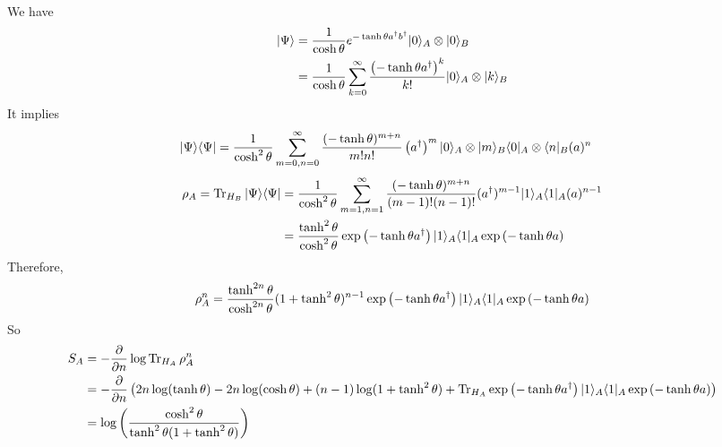 We have 
\begin{equation}
	\begin{split}
	| \Psi \rangle & = \frac{1}{\cosh \theta} e^{-\tanh \theta a^{\dagger} b^{\dagger}} | 0 \rangle_A \otimes | 0 \rangle_B\\
	& = \frac{1}{\cosh \theta} \sum_{k=0}^{\infty} \frac{\left( - \tanh \theta a^{\dagger} \right)^k}{k!} | 0 \rangle_A \otimes | k \rangle_B\\
	\end{split}
\end{equation}
It implies
\begin{equation}
	\begin{split}
	| \Psi \rangle \langle \Psi | & = \frac{1}{\cosh^2 \theta} \sum_{m=0,n=0}^{\infty}\frac{(-\tanh \theta)^{m+n}}{m!n!} \left(a^{\dagger} \right)^m | 0 \rangle_A \otimes | m \rangle_B \langle 0 |_A \otimes \langle n |_B (a)^n
	\end{split}
\end{equation}
\begin{equation}
\begin{split}
\rho_A = \operatorname{Tr}_{H_B} | \Psi \rangle \langle \Psi |& =\frac{1}{\cosh^2 \theta} \sum_{m=1,n=1}^{\infty} \frac{(-\tanh \theta)^{m+n}}{(m-1)!(n-1)!} (a^{\dagger})^{m-1}| 1 \rangle_A \langle 1 |_A (a)^{n-1}\\
& =  \frac{\tanh^2 \theta}{\cosh^2 \theta} \exp\left(-\tanh \theta a^{\dagger} \right) | 1 \rangle_A \langle 1 |_A \exp\left(-\tanh \theta a \right)
\end{split}
\end{equation}
Therefore, 
\begin{equation}
	\rho_A^n = \frac{\tanh^{2n} \theta}{\cosh^{2n} \theta}(1+\tanh^2\theta)^{n-1}\exp\left(-\tanh \theta a^{\dagger} \right) | 1 \rangle_A \langle 1 |_A \exp\left(-\tanh \theta a \right) 
\end{equation}
So 
\begin{equation}
	\begin{split}
	S_A &= - \frac{\partial}{\partial n} \log \operatorname{Tr}_{H_A} \rho_A^n\\
	& = - \frac{\partial}{\partial n} \left( 2n \log(\tanh \theta ) -2n \log (\cosh \theta) + (n-1) \log(1+ \tanh ^2 \theta) + \operatorname{Tr}_{H_A}\exp\left(-\tanh \theta a^{\dagger} \right) | 1 \rangle_A \langle 1 |_A \exp\left(-\tanh \theta a \right)  \right)\\
	& = \log \left(\frac{\cosh^2 \theta}{\tanh^2 \theta (1+ \tanh^2\theta)}\right)
	\end{split}
\end{equation}
